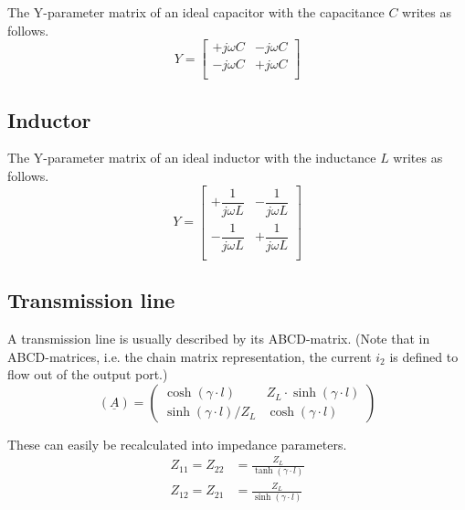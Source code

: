 The Y-parameter matrix of an ideal capacitor with the capacitance $C$
writes as follows.
\begin{equation}
Y =
\begin{bmatrix}
+j\omega C & -j\omega C\\
-j\omega C & +j\omega C\\
\end{bmatrix}
\end{equation}

\subsection{Inductor}

The Y-parameter matrix of an ideal inductor with the inductance $L$
writes as follows.
\begin{equation}
Y =
\begin{bmatrix}
+\dfrac{1}{j\omega L} & -\dfrac{1}{j\omega L}\\
-\dfrac{1}{j\omega L} & +\dfrac{1}{j\omega L}\\
\end{bmatrix}
\end{equation}

\subsection{Transmission line}
\label{sec:tl_yparameter}

A transmission line is usually described by its ABCD-matrix.  (Note
that in ABCD-matrices, i.e. the chain matrix representation, the
current $i_2$ is defined to flow out of the output port.)
\begin{equation}
\left(\underline{A}\right) =
\begin{pmatrix}
\cosh{\left(\gamma\cdot l\right)} & Z_L\cdot \sinh{\left(\gamma\cdot l\right)}\\
\sinh{\left(\gamma\cdot l\right)} / Z_L & \cosh{\left(\gamma\cdot l\right)}
\end{pmatrix}
\end{equation}

These can easily be recalculated into impedance parameters.
\begin{align}
Z_{11} = Z_{22} &= \frac{Z_L}{\tanh{\left(\gamma\cdot l\right)}}\\
Z_{12} = Z_{21} &= \frac{Z_L}{\sinh{\left(\gamma\cdot l\right)}}
\end{align}

